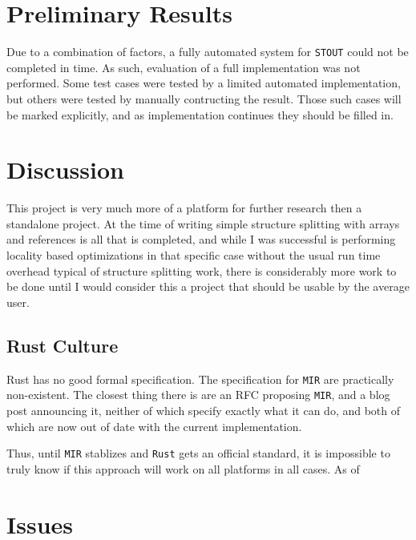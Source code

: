 \documentclass[prodmode,acmtecs]{acmsmall} %
\newcommand{\rustname}{{\texttt{Rust}}}
\def \rust {\rustname{}\xspace}
\newcommand{\mirname}{{\texttt{MIR}}}
\def \mir {\mirname{}\xspace}
\newcommand{\llvmname}{{\texttt{LLVM}}}
\def \llvm {\llvmname{}\xspace}
\newcommand{\projectname}{{\texttt{STOUT}}}
\def \name{\projectname\xspace}
\begin{document}
\section{Preliminary Results}
Due to a combination of factors, a fully automated system for \name could not
be completed in time. As such, evaluation of a full implementation
was not performed. Some test cases were tested by a limited automated implementation,
but others were tested by manually contructing the result. Those such cases
will be marked explicitly, and as implementation continues they should be filled in.



\section{Discussion}
\label{sec:discuss}

This project is very much more of a platform for further research then a
standalone project. At the time of writing simple structure splitting
with arrays and references is all that is completed, and 
while I was successful is performing locality based
optimizations in that specific case without the usual run time overhead typical of structure splitting
work, there is considerably more work to be done until I would consider this
a project that should be usable by the average user.

\todo[inline]{Maybe talk about why not \llvm }

\subsection{Rust Culture}
\label{sec:culture}

Rust has no good
formal specification. The specification for \mir are practically non-existent. %
The closest thing there is are an RFC proposing \mir, and a blog post announcing
it, neither of which specify exactly what it can do, and both of which are now
out of date with the current implementation.

Thus, until \mir stablizes and \rust gets an official standard, it is impossible
to truly know if this approach will work on all platforms in all cases. As of 

\section{Issues}
\end{document}
